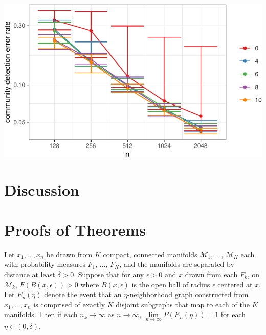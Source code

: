 \documentclass[12pt]{article}
\begin{document}
\begin{center}\includegraphics{draft_files/figure-latex/unnamed-chunk-17-1} \end{center}

\hypertarget{discussion}{%
\section{Discussion}\label{discussion}}

\appendix

\section{Proofs of Theorems}

\begin{lemma}
\label{lemma:no-noise}
Let $x_1, ..., x_n$ be drawn from $K$ compact, connected manifolds $\mathcal{M}_1$, ..., $\mathcal{M}_K$ each with probability measures $F_1$, ..., $F_K$, and the manifolds are separated by distance at least $\delta > 0$. 
Suppose that for any $\epsilon > 0$ and $x$ drawn from each $F_k$, on $\mathcal{M}_k$, $F(B(x, \epsilon)) > 0$ where $B(x, \epsilon)$ is the open ball of radius $\epsilon$ centered at $x$. 
Let $E_n(\eta)$ denote the event that an $\eta$-neighborhood graph constructed from $x_1, ..., x_n$ is comprised of exactly $K$ disjoint subgraphs that map to each of the $K$ manifolds. 
Then if each $n_k \to \infty$ as $n \to \infty$, $\lim\limits_{n \to \infty} P(E_n(\eta)) = 1$ for each $\eta \in (0, \delta)$. 
\end{lemma}
\end{document}
